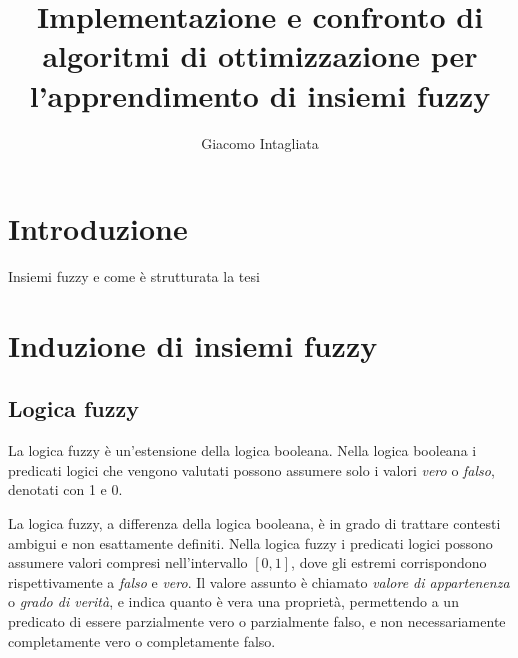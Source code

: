 \documentclass[a4paper,12pt]{report}
\begin{document}
\title{Implementazione e confronto di algoritmi di ottimizzazione per l'apprendimento di insiemi fuzzy}
\author{Giacomo Intagliata}
%
% 
%
\beforepreface

%
%
\afterpreface

%
\chapter*{Introduzione}
\label{Introduzione}
%
Insiemi fuzzy e come è strutturata la tesi
% 


\chapter{Induzione di insiemi fuzzy}
\label{Capitolo 1}
\section{Logica fuzzy}
La logica fuzzy \cite{logica_fuzzy} è un'estensione della logica booleana.
Nella logica booleana i predicati logici che vengono valutati possono assumere solo i valori \textit{vero} o \textit{falso}, denotati con 1 e 0.

La logica fuzzy, a differenza della logica booleana, è in grado di trattare contesti ambigui e non esattamente definiti.
Nella logica fuzzy i predicati logici possono assumere valori compresi nell'intervallo $[0,1]$, dove gli estremi corrispondono rispettivamente a \textit{falso} e \textit{vero}.
Il valore assunto è chiamato \textit{valore di appartenenza} o \textit{grado di verità}, e indica quanto è vera una proprietà, permettendo a un predicato di essere parzialmente vero o parzialmente falso, e non necessariamente completamente vero o completamente falso.
\end{document}
